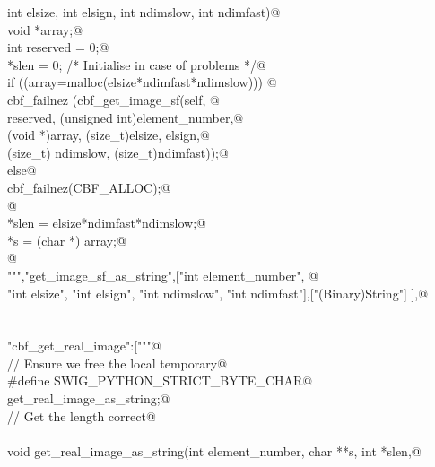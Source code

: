 \documentclass[10pt,a4paper,twoside,notitlepage]{article}
\begin{document}
\begin{flushleft}
\begin{minipage}{\linewidth}
\begin{list}{}{}
\mbox{}\verb@    int elsize, int elsign, int ndimslow, int ndimfast){@\\
\mbox{}\verb@        void *array;@\\
\mbox{}\verb@        int reserved = 0;@\\
\mbox{}\verb@        *slen = 0; /* Initialise in case of problems */@\\
\mbox{}\verb@        if ((array=malloc(elsize*ndimfast*ndimslow))) {@\\
\mbox{}\verb@               cbf_failnez (cbf_get_image_sf(self, @\\
\mbox{}\verb@               reserved, (unsigned int)element_number,@\\
\mbox{}\verb@               (void *)array, (size_t)elsize, elsign,@\\
\mbox{}\verb@               (size_t) ndimslow, (size_t)ndimfast));@\\
\mbox{}\verb@         }else{@\\
\mbox{}\verb@               cbf_failnez(CBF_ALLOC);@\\
\mbox{}\verb@         }@\\
\mbox{}\verb@        *slen = elsize*ndimfast*ndimslow;@\\
\mbox{}\verb@        *s = (char *) array;@\\
\mbox{}\verb@      }@\\
\mbox{}\verb@""","get_image_sf_as_string",["int element_number", @\\
\mbox{}\verb@    "int elsize", "int elsign", "int ndimslow", "int ndimfast"],["(Binary)String"] ],@\\
\mbox{}\verb@@\\
\mbox{}\verb@@\\
\mbox{}\verb@"cbf_get_real_image":["""@\\
\mbox{}\verb@// Ensure we free the local temporary@\\
\mbox{}\verb@%{@\\
\mbox{}\verb@#define SWIG_PYTHON_STRICT_BYTE_CHAR@\\
\mbox{}\verb@%}@\\
\mbox{}\verb@%cstring_output_allocate_size(char ** s, int *slen, free(*$1))@\\
\mbox{}\verb@       get_real_image_as_string;@\\
\mbox{}\verb@// Get the length correct@\\
\mbox{}\verb@@\\
\mbox{}\verb@    void get_real_image_as_string(int element_number, char **s, int *slen,@\\

\end{list}
\end{minipage}
\end{flushleft}
\end{document}
